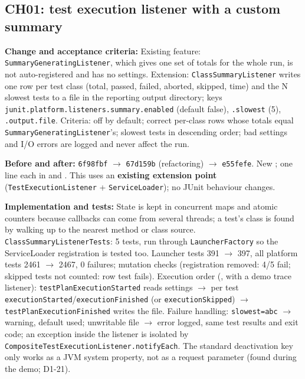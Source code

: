 \documentclass[11pt,a4paper]{article}
\newcommand{\entry}[1]{\textbf{#1:} }
\begin{document}
\subsection*{CH01: test execution listener with a custom summary}
\entry{Change and acceptance criteria}Existing feature: \texttt{SummaryGeneratingListener}, which gives one set of totals for the whole run, is not auto-registered and has no settings. Extension: \texttt{ClassSummaryListener} writes one row per test class (total, passed, failed, aborted, skipped, time) and the N slowest tests to a file in the reporting output directory; keys \texttt{junit.platform.listeners.summary.enabled} (default false), \texttt{.slowest} (5), \texttt{.output.file}. Criteria: off by default; correct per-class rows whose totals equal \texttt{SummaryGeneratingListener}'s; slowest tests in descending order; bad settings and I/O errors are logged and never affect the run.

\entry{Before and after}\texttt{6f98fbf} $\rightarrow$ \texttt{67d159b} (refactoring) $\rightarrow$ \texttt{e55fefe}. New ; one line each in  and . This uses an \textbf{existing extension point} (\texttt{TestExecutionListener} + \texttt{ServiceLoader}); no JUnit behaviour changes.

\entry{Implementation and tests}State is kept in concurrent maps and atomic counters because callbacks can come from several threads; a test's class is found by walking up to the nearest method or class source. \texttt{ClassSummaryListenerTests}: 5 tests, run through \texttt{LauncherFactory} so the ServiceLoader registration is tested too. Launcher tests 391 $\rightarrow$ 397, all platform tests 2461 $\rightarrow$ 2467, 0 failures; mutation checks (registration removed: 4/5 fail; skipped tests not counted: row test fails). Execution order (, with a demo trace listener): \texttt{testPlanExecutionStarted} reads settings $\rightarrow$ per test \texttt{executionStarted}/\texttt{executionFinished} (or \texttt{executionSkipped}) $\rightarrow$ \texttt{testPlanExecutionFinished} writes the file. Failure handling: \texttt{slowest=abc} $\rightarrow$ warning, default used; unwritable file $\rightarrow$ error logged, same test results and exit code; an exception inside the listener is isolated by \texttt{CompositeTestExecutionListener.notifyEach}. The standard deactivation key only works as a JVM system property, not as a request parameter (found during the demo; D1-21).
\end{document}
